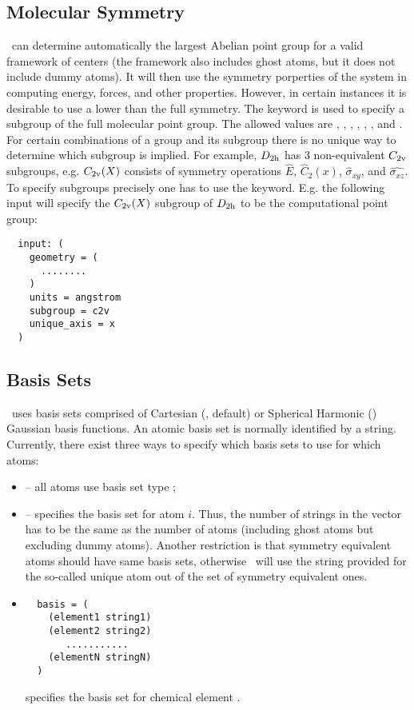 \subsection{Molecular Symmetry}
\PSIthree\ can determine automatically the largest Abelian point group
for a valid framework of centers (the framework also includes ghost
atoms, but it does not include dummy atoms).
It will then use the symmetry porperties of the system in computing energy,
forces, and other properties.
However, in certain instances it is desirable to use a lower than the
full symmetry. The keyword  is used to specify a subgroup of
the full molecular point group. The allowed values are ,
, , , , ,
and . For certain combinations of a group and
its subgroup there is no unique way to determine which subgroup is
implied. For example, $D_{\rm 2h}$ has 3 non-equivalent $C_{\rm 2v}$ subgroups,
e.g. $C_{\rm 2v}(X)$ consists of symmetry operations $\hat{E}$, $\hat{C}_2(x)$,
$\hat{\sigma}_{xy}$, and $\hat{\sigma_{xz}}$. 
To specify subgroups precisely one has to use the 
keyword. E.g. the following input will specify the $C_{\rm 2v}(X)$
subgroup of $D_{\rm 2h}$ to be the computational point group:
\begin{verbatim}
  input: (
    geometry = (
      ........
    )
    units = angstrom
    subgroup = c2v
    unique_axis = x
  )
\end{verbatim}

\subsection{Basis Sets}
\PSIthree\ uses basis sets comprised of Cartesian (, default)
or Spherical Harmonic () Gaussian basis functions.
An atomic basis set is normally identified by a string. Currently, there exist
three ways to specify which basis sets to use for which atoms:
\begin{itemize}
\item {} -- all atoms use basis set type
;
\item {} -- 
specifies the basis set for atom $i$. Thus, the number of strings in the 
vector has to be the same as the number of atoms (including ghost atoms but excluding
dummy atoms). Another restriction is that symmetry equivalent atoms should have
same basis sets, otherwise \PSIinput\ will use the string provided for the so-called
unique atom out of the set of symmetry equivalent ones.
\item 
\begin{verbatim}
  basis = (
    (element1 string1)
    (element2 string2)
       ...........
    (elementN stringN)
  )
\end{verbatim}
 specifies the basis set for chemical element .
\end{itemize}


